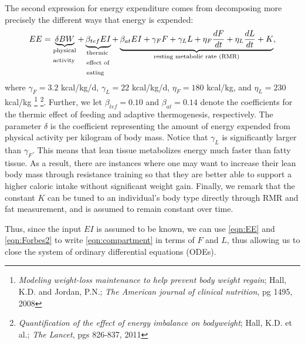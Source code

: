 The second expression for energy expenditure comes from decomposing more precisely the different ways that energy is expended:
\begin{equation}
\label{eqn:EE}
EE = \underbrace{\delta BW}_\text{\parbox{1cm}{physical\\activity}} + \underbrace{\beta_{tef} EI}_\text{\parbox{1cm}{thermic\\effect of\\eating}} + \underbrace{\beta_{at} EI + \gamma_F F + \gamma_L L + \eta_F \dfrac{dF}{dt} + \eta_L \dfrac{dL}{dt}  + K}_\text{resting metabolic rate (RMR)},
\end{equation}
where $\gamma_F = 3.2$ kcal/kg/d, $\gamma_L = 22$ kcal/kg/d, $\eta_F = 180$ kcal/kg, and $\eta_L = 230$ kcal/kg
\footnote{\emph{Modeling weight-loss maintenance to help prevent body weight regain}; Hall, K.D. and Jordan, P.N.; \emph{The American journal of clinical nutrition}, pg 1495, 2008}
\footnote{\emph{Quantification of the effect of energy imbalance on bodyweight}; Hall, K.D. et al.; \emph{The Lancet}, pgs 826-837, 2011}.
Further, we let $\beta_{tef}=0.10$ and $\beta_{at}=0.14$ denote the coefficients for the thermic effect of feeding and adaptive thermogenesis, respectively.
The parameter $\delta$ is the coefficient representing the amount of energy expended from physical activity per kilogram of body mass.
Notice that $\gamma_L$ is significantly larger than $\gamma_F$.
This means that lean tissue metabolizes energy much faster than fatty tissue.
As a result, there are instances where one may want to increase their lean body mass through resistance training so that they are better able to support a higher caloric intake without significant weight gain.
Finally, we remark that the constant $K$ can be tuned to an individual's body type directly through RMR and fat measurement, and is assumed to remain constant over time.


Thus, since the input $EI$ is assumed to be known, we can use \eqref{eqn:EE} and \eqref{eqn:Forbes2} to write \eqref{eqn:compartment} in terms of $F$ and $L$, thus allowing us to close the system of ordinary differential equations (ODEs).

